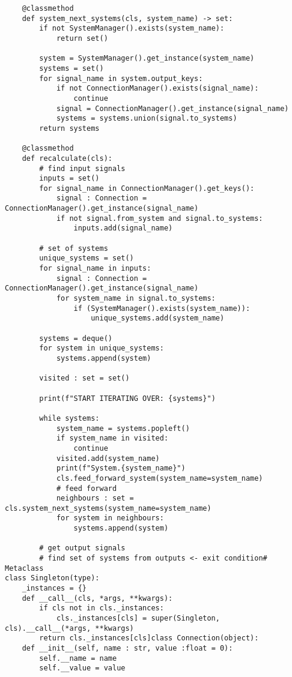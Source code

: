 \begin{lstlisting}
    @classmethod
    def system_next_systems(cls, system_name) -> set:
        if not SystemManager().exists(system_name):
            return set()
        
        system = SystemManager().get_instance(system_name)
        systems = set()
        for signal_name in system.output_keys:
            if not ConnectionManager().exists(signal_name):
                continue
            signal = ConnectionManager().get_instance(signal_name)
            systems = systems.union(signal.to_systems)
        return systems
    
    @classmethod
    def recalculate(cls):
        # find input signals
        inputs = set()
        for signal_name in ConnectionManager().get_keys():
            signal : Connection = ConnectionManager().get_instance(signal_name)
            if not signal.from_system and signal.to_systems:
                inputs.add(signal_name)
        
        # set of systems
        unique_systems = set()
        for signal_name in inputs:
            signal : Connection = ConnectionManager().get_instance(signal_name)
            for system_name in signal.to_systems:
                if (SystemManager().exists(system_name)):
                    unique_systems.add(system_name)
        
        systems = deque()
        for system in unique_systems:
            systems.append(system)
        
        visited : set = set()
        
        print(f"START ITERATING OVER: {systems}")
        
        while systems:
            system_name = systems.popleft()
            if system_name in visited:
                continue
            visited.add(system_name)
            print(f"System.{system_name}")
            cls.feed_forward_system(system_name=system_name)
            # feed forward
            neighbours : set = cls.system_next_systems(system_name=system_name)
            for system in neighbours:
                systems.append(system)
        
        # get output signals
        # find set of systems from outputs <- exit condition# Metaclass
class Singleton(type):
    _instances = {}
    def __call__(cls, *args, **kwargs):
        if cls not in cls._instances:
            cls._instances[cls] = super(Singleton, cls).__call__(*args, **kwargs)
        return cls._instances[cls]class Connection(object):
    def __init__(self, name : str, value :float = 0):
        self.__name = name
        self.__value = value
        

\end{lstlisting}
